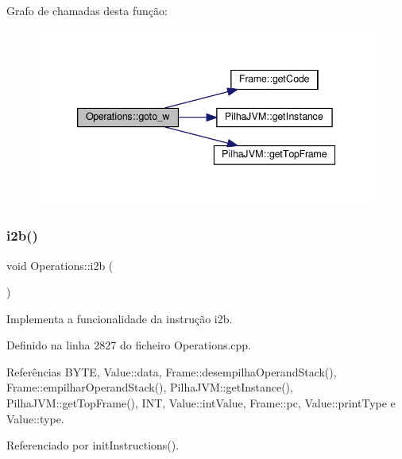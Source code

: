 Grafo de chamadas desta função\+:
\nopagebreak
\begin{figure}[H]
\begin{center}
\leavevmode
\includegraphics[width=339pt]{classOperations_aed8436ead5dfcaef69b24e1b2fff7744_cgraph}
\end{center}
\end{figure}
\mbox{\label{classOperations_adfe0344bae5a1252330b7324e827ed35}} 
\subsubsection{\texorpdfstring{i2b()}{i2b()}}
{\footnotesize\ttfamily void Operations\+::i2b (\begin{DoxyParamCaption}{ }\end{DoxyParamCaption})\hspace{0.3cm}{\ttfamily [private]}}



Implementa a funcionalidade da instrução i2b. 



Definido na linha 2827 do ficheiro Operations.\+cpp.



Referências B\+Y\+TE, Value\+::data, Frame\+::desempilha\+Operand\+Stack(), Frame\+::empilhar\+Operand\+Stack(), Pilha\+J\+V\+M\+::get\+Instance(), Pilha\+J\+V\+M\+::get\+Top\+Frame(), I\+NT, Value\+::int\+Value, Frame\+::pc, Value\+::print\+Type e Value\+::type.



Referenciado por init\+Instructions().


